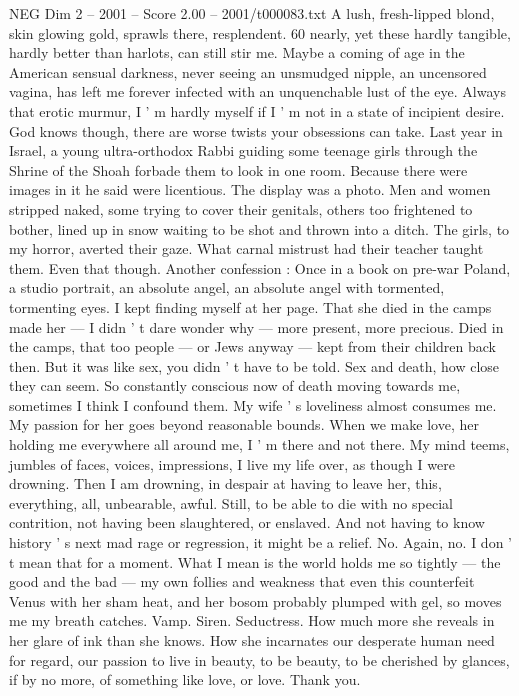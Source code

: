 \begin{textsample}{NEG Dim 2 – 2001 – Score 2.00 – 2001/t000083.txt}
A lush, fresh-lipped blond, skin glowing gold, sprawls there, resplendent. 60 nearly, yet these hardly tangible, hardly better than harlots, can still stir me.
Maybe a coming of age in the American sensual darkness, never seeing an unsmudged nipple, an uncensored vagina, has left me forever infected with an unquenchable lust of the eye.
Always that erotic murmur, I ' m hardly myself if I ' m not in a state of incipient desire.
God knows though, there are worse twists your obsessions can take.
Last year in Israel, a young ultra-orthodox Rabbi guiding some teenage girls through the Shrine of the Shoah forbade them to look in one room.
Because there were images in it he said were licentious.
The display was a photo.
Men and women stripped naked, some trying to cover their genitals, others too frightened to bother, lined up in snow waiting to be shot and thrown into a ditch.
The girls, to my horror, averted their gaze.
What carnal mistrust had their teacher taught them.
Even that though.
Another confession : Once in a book on pre-war Poland, a studio portrait, an absolute angel, an absolute angel with tormented, tormenting eyes.
I kept finding myself at her page.
That she died in the camps made her — I didn ' t dare wonder why — more present, more precious.
Died in the camps, that too people — or Jews anyway — kept from their children back then.
But it was like sex, you didn ' t have to be told.
Sex and death, how close they can seem.
So constantly conscious now of death moving towards me, sometimes I think I confound them.
My wife ' s loveliness almost consumes me.
My passion for her goes beyond reasonable bounds.
When we make love, her holding me everywhere all around me, I ' m there and not there.
My mind teems, jumbles of faces, voices, impressions, I live my life over, as though I were drowning.
Then I am drowning, in despair at having to leave her, this, everything, all, unbearable, awful.
Still, to be able to die with no special contrition, not having been slaughtered, or enslaved.
And not having to know history ' s next mad rage or regression, it might be a relief.
No.
Again, no.
I don ' t mean that for a moment.
What I mean is the world holds me so tightly — the good and the bad — my own follies and weakness that even this counterfeit Venus with her sham heat, and her bosom probably plumped with gel, so moves me my breath catches.
Vamp.
Siren.
Seductress.
How much more she reveals in her glare of ink than she knows.
How she incarnates our desperate human need for regard, our passion to live in beauty, to be beauty, to be cherished by glances, if by no more, of something like love, or love.
Thank you.

\end{textsample}
